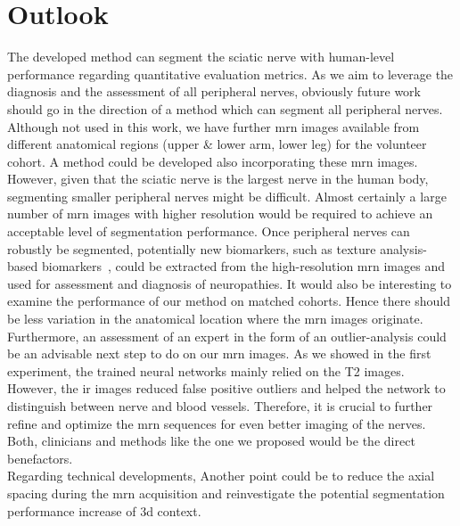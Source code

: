 \chapter{Outlook} \label{chap:outlook}
The developed method can segment the sciatic nerve with human-level performance regarding quantitative evaluation metrics. As we aim to leverage the diagnosis and the assessment of all peripheral nerves, obviously future work should go in the direction of a method which can segment all peripheral nerves. Although not used in this work, we have further \gls{mrn} images available from different anatomical regions (upper \& lower arm, lower leg) for the volunteer cohort. A method could be developed also incorporating these \gls{mrn} images. However, given that the sciatic nerve is the largest nerve in the human body, segmenting smaller peripheral nerves might be difficult. Almost certainly a large number of \gls{mrn} images with higher resolution would be required to achieve an acceptable level of segmentation performance. Once peripheral nerves can robustly be segmented, potentially new biomarkers, such as texture analysis-based biomarkers~\cite{FelisazTextureNeuropathy}, could be extracted from the high-resolution \gls{mrn} images and used for assessment and diagnosis of neuropathies. It would also be interesting to examine the performance of our method on matched cohorts. Hence there should be less variation in the anatomical location where the \gls{mrn} images originate. Furthermore, an assessment of an expert in the form of an outlier-analysis could be an advisable next step to do on our \gls{mrn} images. As we showed in the first experiment, the trained neural networks mainly relied on the T2 images. However, the \gls{ir} images reduced false positive outliers and helped the network to distinguish between nerve and blood vessels. Therefore, it is crucial to further refine and optimize the \gls{mrn} sequences for even better imaging of the nerves. Both, clinicians and methods like the one we proposed would be the direct benefactors.\\
Regarding technical developments, Another point could be to reduce the axial spacing during the \gls{mrn} acquisition and reinvestigate the potential segmentation performance increase of \gls{3d} context.
